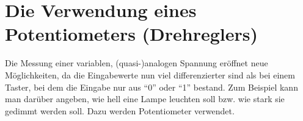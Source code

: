 \newpage
{}
\section{Die Verwendung eines Potentiometers (Drehreglers)} \label{sec:potentiometer}
Die Messung einer variablen, (quasi-)analogen Spannung eröffnet neue Möglichkeiten, da die Eingabewerte nun viel differenzierter sind als bei einem Taster, bei dem die Eingabe nur aus \enquote{0} oder \enquote{1} bestand. Zum Beispiel kann man darüber angeben, wie hell eine Lampe leuchten soll bzw. wie stark sie gedimmt werden soll. Dazu werden Potentiometer verwendet.

